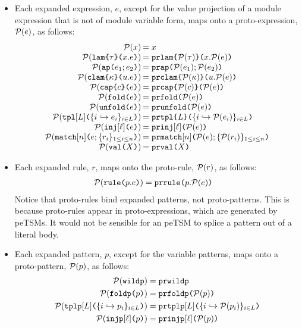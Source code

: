 \begin{itemize}
  \item Each expanded expression, $e$, except for the value projection of a module expression that is not of module variable form, maps onto a proto-expression, $\mathcal{P}(e)$, as follows:
  \[\arraycolsep=1pt\begin{array}{rl}
  \Cof{x} & = x\\
  \Cof{\aelam{\tau}{x}{e}} & = \acelam{\Cof{\tau}}{x}{\Cof{e}}\\
  \Cof{\aeap{e_1}{e_2}} & = \aceap{\Cof{e_1}}{\Cof{e_2}}\\
  \Cof{\aeclam{\kappa}{u}{e}} & = \aceclam{\Cof{\kappa}}{u}{\Cof{e}}\\
  \Cof{\aecap{e}{c}} & = \acecap{\Cof{e}}{\Cof{c}}\\
  \Cof{\aefold{e}} & = \acefold{\Cof e}\\
  \Cof{\aeunfold{e}} & = \aceunfold{\Cof{e}}\\
  \Cof{\aetpl{\labelset}{\mapschema{e}{i}{\labelset}}} & = \acetpl{\labelset}{\mapschemax{\Cofv}{e}{i}{\labelset}}\\
  \Cof{\aein{\ell}{e}} &= \acein{\ell}{\Cof{e}}\\
  \Cof{\aematchwith{n}{e}{\seqschemaX{r}}} & = \acematchwith{n}{\Cof{e}}{\seqschemaXx{\Cofv}{r}}\\
  \Cof{\amval{X}} & = \acemval{X}
  \end{array}\]
  \item Each expanded rule, $r$, maps onto the proto-rule, $\mathcal{P}(r)$, as follows:
  \begin{align*}
  \mathcal{P}(\texttt{rule}\texttt{(}p.e\texttt{)}) & = \texttt{prrule}\texttt{(}p.\mathcal{P}(e)\texttt{)}
  \end{align*}
  Notice that proto-rules bind expanded patterns, not proto-patterns. This is because proto-rules appear in proto-expressions, which are generated by peTSMs. It would not be sensible for an peTSM to splice a pattern out of a literal body.
  \item Each expanded pattern, $p$, except for the variable patterns, maps onto a proto-pattern, $\mathcal{P}(p)$, as follows:
  \begin{align*}
  \mathcal{P}(\texttt{wildp}) & = \texttt{prwildp}\\
  \mathcal{P}(\texttt{foldp}\texttt{(}p\texttt{)}) & = \texttt{prfoldp}\texttt{(}\mathcal{P}(p)\texttt{)}\\
  \mathcal{P}(\texttt{tplp}[L]\texttt{(}\{i \hookrightarrow p_{i}\}_{i \in L}\texttt{)}) & = \texttt{prtplp}[L]\texttt{(}\{i \hookrightarrow \mathcal{P}(p_{i})\}_{i \in L}\texttt{)}\\
  \mathcal{P}(\texttt{injp}[\ell]\texttt{(}p\texttt{)}) & = \texttt{prinjp}[\ell]\texttt{(}\mathcal{P}(p)\texttt{)}
  \end{align*}
\end{itemize}


